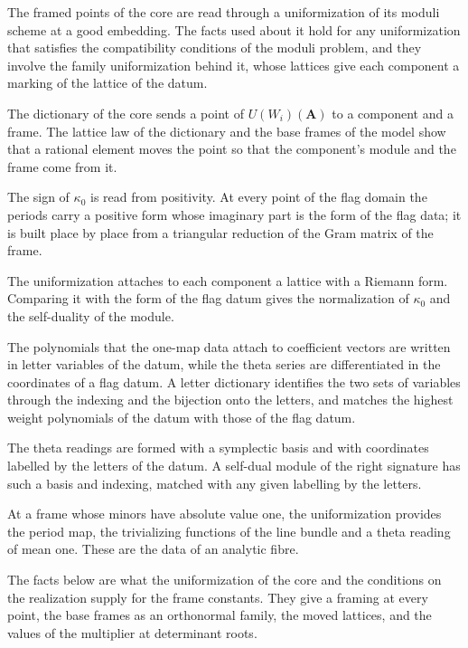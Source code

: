 The framed points of the core are read through a uniformization of its moduli scheme at a good embedding.
The facts used about it hold for any uniformization that satisfies the compatibility conditions of the
moduli problem, and they involve the family uniformization behind it, whose lattices give each component a
marking of the lattice of the datum.

The dictionary of the core sends a point of $U(W_i)(\mathbf A)$ to a component and a frame. The lattice law
of the dictionary and the base frames of the model show that a rational element moves the point so that the
component's module and the frame come from it.

The sign of $\kappa_0$ is read from positivity. At every point of the flag domain the periods carry a
positive form whose imaginary part is the form of the flag data; it is built place by place from a
triangular reduction of the Gram matrix of the frame.

The uniformization attaches to each component a lattice with a Riemann form. Comparing it with the form of
the flag datum gives the normalization of $\kappa_0$ and the self-duality of the module.

The polynomials that the one-map data attach to coefficient vectors are written in letter variables of the
datum, while the theta series are differentiated in the coordinates of a flag datum. A letter dictionary
identifies the two sets of variables through the indexing and the bijection onto the letters, and matches
the highest weight polynomials of the datum with those of the flag datum.

The theta readings are formed with a symplectic basis and with coordinates labelled by the letters of the
datum. A self-dual module of the right signature has such a basis and indexing, matched with any given
labelling by the letters.

At a frame whose minors have absolute value one, the uniformization provides the period map, the
trivializing functions of the line bundle and a theta reading of mean one. These are the data of an
analytic fibre.

The facts below are what the uniformization of the core and the conditions on the realization supply
for the frame constants. They give a framing at every point, the base frames as an orthonormal family, the
moved lattices, and the values of the multiplier at determinant roots.

